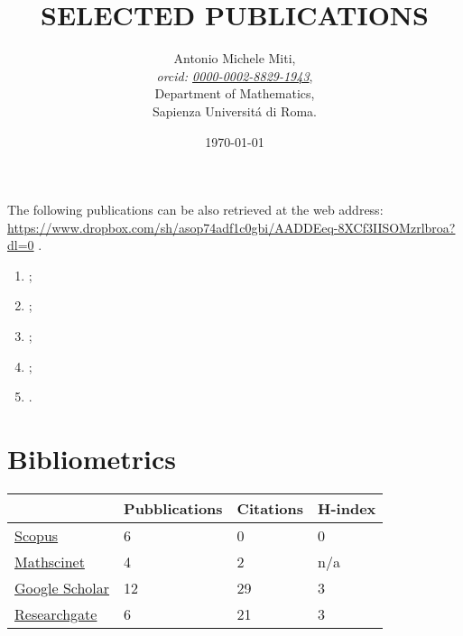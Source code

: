 \documentclass[a4paper]{article}
\title{SELECTED PUBLICATIONS}
\date{\today}
\author{
	Antonio Michele Miti,\\
	\emph{orcid: \href{https://orcid.org/0000-0002-8829-1943}{0000-0002-8829-1943}},
	\\
	Department of Mathematics,\\
	Sapienza Universit\'a di Roma.
}
\begin{document}
  

	\maketitle

	\noindent
  The following publications can be also retrieved at the web address:
  \\ 
  \url{https://www.dropbox.com/sh/asop74adf1c0gbi/AADDEeq-8XCf3IISOMzrlbroa?dl=0}
  .


	  \begin{enumerate}
    	\item {};
		\item {};	  
		\item {};		
 		\item {};
 		\item {}.
	  \end{enumerate}

	\section*{Bibliometrics}

	\begin{center}
		\begin{tabularx}{.75\linewidth}{|X|p{7em}|p{7em}|p{7em}|}
				\hline
				 & 
				 Pubblications & 
				 Citations &
				 H-index 
				 \\
				 \hline 
				 \href{https://www.scopus.com/authid/detail.uri?authorId=57218509273\#tab=preprints}{Scopus} & 6 & 0 &0 
				 \\
				\href{https://mathscinet.ams.org/mathscinet/author?authorId=1435797}{Mathscinet} & 4 & 2 & n/a 
				\\
				\href{https://scholar.google.com/citations?user=DWKPuJYAAAAJ\&hl=it\&oi=ao}{Google Scholar} & 12 & 29 & 3 
				\\
				\href{https://www.researchgate.net/profile/Antonio-Miti}{Researchgate} & 6 & 21 & 3 
				\\
				\hline
		\end{tabularx}
	\end{center}
\end{document}
